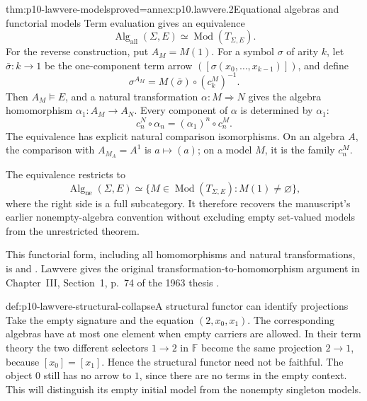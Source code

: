 \begin{hbtheorem}{thm:p10-lawvere-models}{proved=annex:p10.lawvere.2}{Equational algebras and functorial models}
Term evaluation gives an equivalence
\[
 \operatorname{Alg}_{\mathrm{all}}(\Sigma,E)
           \simeq\operatorname{Mod}(T_{\Sigma,E}).
\]
For the reverse construction, put \(A_M=M(1)\).
For a symbol \(\sigma\) of arity \(k\), let
\(\bar\sigma:k\to1\) be the one-component term arrow
\(([\sigma(x_0,\ldots,x_{k-1})])\), and define
\[
                     \sigma^{A_M}
                         =M(\bar\sigma)\circ(c_k^M)^{-1}.
\]
Then \(A_M\models E\), and a natural transformation
\(\alpha:M\Rightarrow N\) gives the algebra homomorphism
\(\alpha_1:A_M\to A_N\).
Every component of \(\alpha\) is determined by \(\alpha_1\):
\[
                     c_n^N\circ\alpha_n
                        =(\alpha_1)^n\circ c_n^M.
\]
The equivalence has explicit natural comparison isomorphisms.
On an algebra \(A\), the comparison with \(A_{M_A}=A^1\)
is \(a\mapsto(a)\); on a model \(M\), it is the family \(c_n^M\).

The equivalence restricts to
\[
 \operatorname{Alg}_{\mathrm{ne}}(\Sigma,E)
 \simeq
 \{M\in\operatorname{Mod}(T_{\Sigma,E}):M(1)\ne\varnothing\},
\]
where the right side is a full subcategory.
It therefore recovers the manuscript's earlier nonempty-algebra
convention without excluding empty set-valued models from the
unrestricted theorem.
\end{hbtheorem}

This functorial form, including all homomorphisms and natural
transformations, is
\cite[Theorem~13.11, p.~125; Proposition~11.8, p.~99]
{AdamekRosickyVitale2010Draft}
and \cite[Corollary~4.2.6(ii), p.~35]{Pitts1995Draft}.
Lawvere gives the original transformation-to-homomorphism
argument in Chapter~III, Section~1, p.~74 of the 1963 thesis
\cite{Lawvere2004FunctorialReprint}.

\begin{hbexample}{def:p10-lawvere-structural-collapse}{A structural functor can identify projections}
Take the empty signature and the equation
\((2,x_0,x_1)\).
The corresponding algebras have at most one element when empty
carriers are allowed.
In their term theory the two different selectors \(1\to2\) in
\(\mathbb F\) become the same projection \(2\to1\), because
\([x_0]=[x_1]\).
Hence the structural functor need not be faithful.
The object \(0\) still has no arrow to \(1\), since there are
no terms in the empty context.  This will distinguish its empty
initial model from the nonempty singleton models.
\end{hbexample}
